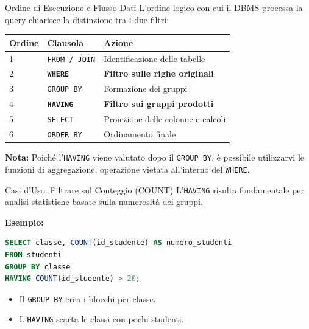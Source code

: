 \documentclass{beamer}
\begin{document}
\begin{frame}[fragile]{Ordine di Esecuzione e Flusso Dati}
L'ordine logico con cui il DBMS processa la query chiarisce la distinzione tra i due filtri:

\begin{center}
\begin{tabular}{|l|l|l|}
\hline
\textbf{Ordine} & \textbf{Clausola} & \textbf{Azione} \\ \hline
1 & \texttt{FROM / JOIN} & Identificazione delle tabelle \\ \hline
2 & \textbf{\texttt{WHERE}} & \textbf{Filtro sulle righe originali} \\ \hline
3 & \texttt{GROUP BY} & Formazione dei gruppi \\ \hline
4 & \textbf{\texttt{HAVING}} & \textbf{Filtro sui gruppi prodotti} \\ \hline
5 & \texttt{SELECT} & Proiezione delle colonne e calcoli \\ \hline
6 & \texttt{ORDER BY} & Ordinamento finale \\ \hline
\end{tabular}
\end{center}

\medskip
\textbf{Nota:} Poiché l'\texttt{HAVING} viene valutato dopo il \texttt{GROUP BY}, è possibile utilizzarvi le funzioni di aggregazione, operazione vietata all'interno del \texttt{WHERE}.
\end{frame}

\begin{frame}[fragile]{Casi d'Uso: Filtrare sul Conteggio (COUNT)}
L'\texttt{HAVING} risulta fondamentale per analisi statistiche basate sulla numerosità dei gruppi.

\medskip
\textbf{Esempio:}
\begin{lstlisting}[language=SQL]
SELECT classe, COUNT(id_studente) AS numero_studenti
FROM studenti
GROUP BY classe
HAVING COUNT(id_studente) > 20;
\end{lstlisting}

\begin{itemize}
    \item Il \texttt{GROUP BY} crea i blocchi per classe.
    \item L'\texttt{HAVING} scarta le classi con pochi studenti.
\end{itemize}
\end{frame}
\end{document}
